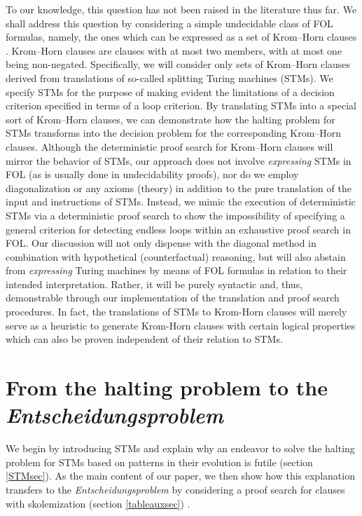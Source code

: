 \documentclass[%
  manuscript=article,   %
  year=2024,
  volume=77,
  doi=00000.000,
]{zfn}
\begin{document}
To our knowledge, this question has not been raised in the literature thus far. We shall address this question by considering a simple undecidable class of FOL formulas, namely, the ones which can be expressed as a set of Krom--Horn clauses%
. Krom--Horn clauses are clauses with at most two members, with at most one being non-negated. Specifically, we will consider only sets of Krom--Horn clauses derived from translations of so-called splitting Turing machines (STMs). We specify STMs for the purpose of making evident the limitations of a decision criterion specified in terms of a loop criterion. By translating STMs into a special sort of Krom--Horn clauses, we can demonstrate how the halting problem for STMs transforms into the decision problem for the corresponding Krom--Horn clauses. Although the deterministic proof search for Krom--Horn clauses %
will mirror the behavior of STMs, our approach does not involve \emph{expressing}
STMs in FOL (as is usually done in undecidability proofs), nor do we employ diagonalization or any axioms (theory) in addition to the pure translation of the input and instructions of STMs.
Instead, we mimic the execution of deterministic STMs via a deterministic proof search to show the impossibility of specifying a general criterion for detecting endless loops within an exhaustive proof search in FOL. Our discussion will not only dispense with the diagonal method in combination with hypothetical (counterfactual) reasoning, but will also abstain from \emph{expressing} Turing machines by means of FOL formulas in relation to their intended interpretation. Rather, it will be purely syntactic and, thus, demonstrable through our implementation of the translation and proof search procedures. In fact, the translations of STMs to Krom-Horn clauses will merely serve as a heuristic to generate Krom-Horn clauses with certain logical properties which can also be proven independent of their relation to STMs.


\section{From the halting problem to the \textit{Ent\-schei\-dungs\-problem}}\label{results}

We begin by introducing STMs and explain why an endeavor to solve the halting problem for STMs based on patterns in their evolution is futile (section \ref{STMsec}). As the main content of our paper, we
then show how this explanation transfers to the \emph{Entscheidungsproblem} by considering a proof search for clauses with skolemization (section \ref{tableauxsec})%
.
\end{document}
